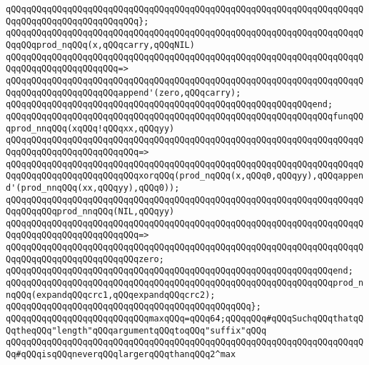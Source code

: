 \verb|qQQqqQQqqQQqqQQqqQQqqQQqqQQqqQQqqQQqqQQqqQQqqQQqqQQqqQQqqQQqqQQqqQQqqQQqqQQqqQQqqQQqqQQqqQQqqQQq};|\newline
\newline
\verb|qQQqqQQqqQQqqQQqqQQqqQQqqQQqqQQqqQQqqQQqqQQqqQQqqQQqqQQqqQQqqQQqqQQqqQQqqQQqprod_nqQQq(x,qQQqcarry,qQQqNIL)|\newline
\verb|qQQqqQQqqQQqqQQqqQQqqQQqqQQqqQQqqQQqqQQqqQQqqQQqqQQqqQQqqQQqqQQqqQQqqQQqqQQqqQQqqQQqqQQqqQQq=>|\newline
\verb|qQQqqQQqqQQqqQQqqQQqqQQqqQQqqQQqqQQqqQQqqQQqqQQqqQQqqQQqqQQqqQQqqQQqqQQqqQQqqQQqqQQqqQQqqQQqappend'(zero,qQQqcarry);|\newline
\verb|qQQqqQQqqQQqqQQqqQQqqQQqqQQqqQQqqQQqqQQqqQQqqQQqqQQqqQQqqQQqend;|\newline
\newline
\verb|qQQqqQQqqQQqqQQqqQQqqQQqqQQqqQQqqQQqqQQqqQQqqQQqqQQqqQQqqQQqqQQqfunqQQqprod_nnqQQq(xqQQq!qQQqxx,qQQqyy)|\newline
\verb|qQQqqQQqqQQqqQQqqQQqqQQqqQQqqQQqqQQqqQQqqQQqqQQqqQQqqQQqqQQqqQQqqQQqqQQqqQQqqQQqqQQqqQQqqQQqqQQq=>|\newline
\verb|qQQqqQQqqQQqqQQqqQQqqQQqqQQqqQQqqQQqqQQqqQQqqQQqqQQqqQQqqQQqqQQqqQQqqQQqqQQqqQQqqQQqqQQqqQQqqQQqxorqQQq(prod_nqQQq(x,qQQq0,qQQqyy),qQQqappend'(prod_nnqQQq(xx,qQQqyy),qQQq0));|\newline
\newline
\verb|qQQqqQQqqQQqqQQqqQQqqQQqqQQqqQQqqQQqqQQqqQQqqQQqqQQqqQQqqQQqqQQqqQQqqQQqqQQqqQQqprod_nnqQQq(NIL,qQQqyy)|\newline
\verb|qQQqqQQqqQQqqQQqqQQqqQQqqQQqqQQqqQQqqQQqqQQqqQQqqQQqqQQqqQQqqQQqqQQqqQQqqQQqqQQqqQQqqQQqqQQqqQQq=>|\newline
\verb|qQQqqQQqqQQqqQQqqQQqqQQqqQQqqQQqqQQqqQQqqQQqqQQqqQQqqQQqqQQqqQQqqQQqqQQqqQQqqQQqqQQqqQQqqQQqqQQqzero;|\newline
\verb|qQQqqQQqqQQqqQQqqQQqqQQqqQQqqQQqqQQqqQQqqQQqqQQqqQQqqQQqqQQqqQQqend;|\newline
\newline
\verb|qQQqqQQqqQQqqQQqqQQqqQQqqQQqqQQqqQQqqQQqqQQqqQQqqQQqqQQqqQQqqQQqprod_nnqQQq(expandqQQqcrc1,qQQqexpandqQQqcrc2);|\newline
\verb|qQQqqQQqqQQqqQQqqQQqqQQqqQQqqQQqqQQqqQQqqQQqqQQq};|\newline
\newline
\verb|qQQqqQQqqQQqqQQqqQQqqQQqqQQqmaxqQQq=qQQq64;qQQqqQQq#qQQqSuchqQQqthatqQQqtheqQQq"length"qQQqargumentqQQqtoqQQq"suffix"qQQq|\newline
\verb|qQQqqQQqqQQqqQQqqQQqqQQqqQQqqQQqqQQqqQQqqQQqqQQqqQQqqQQqqQQqqQQqqQQqqQQq#qQQqisqQQqneverqQQqlargerqQQqthanqQQq2^max|\newline
